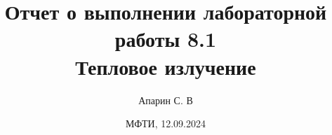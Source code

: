 \title{Отчет о выполнении лабораторной работы 8.1 \\ 
\textbf{Тепловое излучение }}
\author{Апарин С. В}
\date{ МФТИ, 12.09.2024 \\}

\maketitle
\vspace {15 mm}
